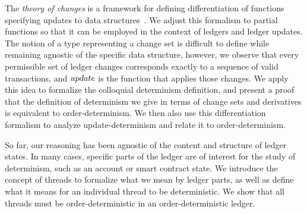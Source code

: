 The \emph{theory of changes}  is a framework for defining differentiation
of functions specifying updates to data structures~\cite{incremental}. We adjust this formalism to partial functions so that
it can be employed in the context of ledgers and ledger updates.
The notion of a type representing a change
set is difficult to define while remaining agnostic of the specific data structure, however,
we observe that every permissible set of ledger changes corresponds exactly
to a sequence of valid transactions, and $\ups$ is the function that applies those changes.
We apply this idea to formalize the colloquial determinism definition,
and present a proof that the definition of determinism we give in terms of
change sets and derivatives is equivalent to order-determinism. We then also
use this differentiation formalism to analyze update-determinism and relate
it to order-determinism.

So far, our reasoning has been agnostic of the content and structure of ledger
states. In many cases, specific parts of the ledger are of interest for the
study of determinism, such as an account or smart contract state. We introduce
the concept of threads to formalize what we mean by ledger parts, as well
as define what it means for an individual thread to be deterministic.
We show that all threads must be order-deterministic in an order-deterministic ledger.
